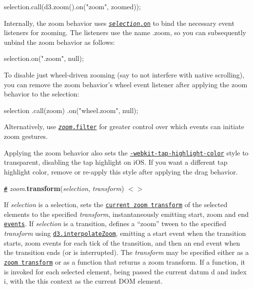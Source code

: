 \begin{DoxyCode}
selection.call(d3.zoom().on("zoom", zoomed));
\end{DoxyCode}


Internally, the zoom behavior uses \href{https://github.com/d3/d3-selection#selection_on}{\tt {\itshape selection}.on} to bind the necessary event listeners for zooming. The listeners use the name {\ttfamily .zoom}, so you can subsequently unbind the zoom behavior as follows\+:


\begin{DoxyCode}
selection.on(".zoom", null);
\end{DoxyCode}


To disable just wheel-\/driven zooming (say to not interfere with native scrolling), you can remove the zoom behavior’s wheel event listener after applying the zoom behavior to the selection\+:


\begin{DoxyCode}
selection
    .call(zoom)
    .on("wheel.zoom", null);
\end{DoxyCode}


Alternatively, use \href{#zoom_filter}{\tt {\itshape zoom}.filter} for greater control over which events can initiate zoom gestures.

Applying the zoom behavior also sets the \href{https://developer.apple.com/library/mac/documentation/AppleApplications/Reference/SafariWebContent/AdjustingtheTextSize/AdjustingtheTextSize.html#//apple_ref/doc/uid/TP40006510-SW5}{\tt -\/webkit-\/tap-\/highlight-\/color} style to transparent, disabling the tap highlight on i\+OS. If you want a different tap highlight color, remove or re-\/apply this style after applying the drag behavior.

\href{#zoom_transform}{\tt \#} {\itshape zoom}.{\bfseries transform}({\itshape selection}, {\itshape transform}) \href{https://github.com/d3/d3-zoom/blob/master/src/zoom.js#L76}{\tt $<$$>$}

If {\itshape selection} is a selection, sets the \href{#zoomTransform}{\tt current zoom transform} of the selected elements to the specified {\itshape transform}, instantaneously emitting start, zoom and end \href{#zoom-events}{\tt events}. If {\itshape selection} is a transition, defines a “zoom” tween to the specified {\itshape transform} using \href{https://github.com/d3/d3-interpolate#interpolateZoom}{\tt d3.\+interpolate\+Zoom}, emitting a start event when the transition starts, zoom events for each tick of the transition, and then an end event when the transition ends (or is interrupted). The {\itshape transform} may be specified either as a \href{#zoom-transforms}{\tt zoom transform} or as a function that returns a zoom transform. If a function, it is invoked for each selected element, being passed the current datum {\ttfamily d} and index {\ttfamily i}, with the {\ttfamily this} context as the current D\+OM element.

